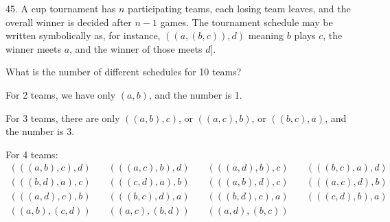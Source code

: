 \begin{problem}{45.} 
	A cup tournament has $n$ participating teams, each losing team leaves, and the overall winner is decided after $n-1$ games.
	The tournament schedule may be written symbolically as, for instance,  $((a,(b,c)),d)$ meaning $b$ plays $c$, the winner meets $a$, and the winner of those meets $d$].

	What is the number of different schedules for 10 teams? 

	For 2 teams, we have only $(a,b)$, and the number is 1.

	For 3 teams, there are only $((a,b),c)$, or $((a,c),b)$, or $((b,c),a)$, and the number is 3.

	For 4 teams:
	$$\begin{array}{cccc}
	(((a,b),c),d) & \quad (((a,c),b),d) & \quad (((a,d),b),c) & \quad (((b,c),a),d) \\
	(((b,d),a),c) & \quad (((c,d),a),b) & \quad (((a,b),d),c) & \quad (((a,c),d),b) \\ 
	(((a,d),c),b) & \quad (((b,c),d),a) & \quad (((b,d),c),a) & \quad (((c,d),b),a) \\
	((a,b),(c,d)) & \quad ((a,c),(b,d)) & \quad ((a,d),(b,c))
	\end{array}$$
\end{problem}

